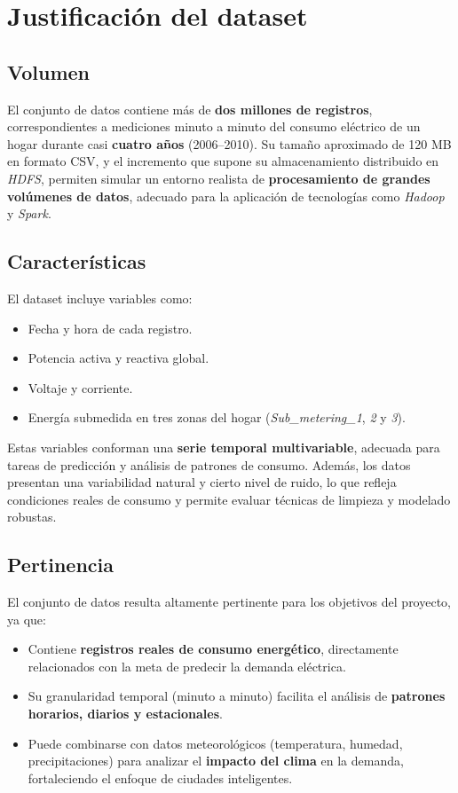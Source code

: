 \documentclass[12pt,a4paper]{article}
\begin{document}
\section{Justificación del dataset}

\subsection*{Volumen}
El conjunto de datos contiene más de \textbf{dos millones de registros}, correspondientes a mediciones minuto a minuto del consumo eléctrico de un hogar durante casi \textbf{cuatro años} (2006–2010).  
Su tamaño aproximado de 120 MB en formato CSV, y el incremento que supone su almacenamiento distribuido en \textit{HDFS}, permiten simular un entorno realista de \textbf{procesamiento de grandes volúmenes de datos}, adecuado para la aplicación de tecnologías como \textit{Hadoop} y \textit{Spark}.

\subsection*{Características}
El dataset incluye variables como:
\begin{itemize}
    \item Fecha y hora de cada registro.
    \item Potencia activa y reactiva global.
    \item Voltaje y corriente.
    \item Energía submedida en tres zonas del hogar (\textit{Sub\_metering\_1}, \textit{2} y \textit{3}).
\end{itemize}
Estas variables conforman una \textbf{serie temporal multivariable}, adecuada para tareas de predicción y análisis de patrones de consumo.  
Además, los datos presentan una variabilidad natural y cierto nivel de ruido, lo que refleja condiciones reales de consumo y permite evaluar técnicas de limpieza y modelado robustas.

\subsection*{Pertinencia}
El conjunto de datos resulta altamente pertinente para los objetivos del proyecto, ya que:
\begin{itemize}
    \item Contiene \textbf{registros reales de consumo energético}, directamente relacionados con la meta de predecir la demanda eléctrica.
    \item Su granularidad temporal (minuto a minuto) facilita el análisis de \textbf{patrones horarios, diarios y estacionales}.
    \item Puede combinarse con datos meteorológicos (temperatura, humedad, precipitaciones) para analizar el \textbf{impacto del clima} en la demanda, fortaleciendo el enfoque de ciudades inteligentes.
\end{itemize}
\end{document}
